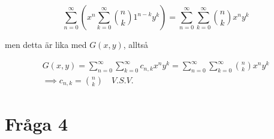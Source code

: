 \documentclass{article}
\begin{document}
\begin{enumerate}[label=(\roman*)]
		 \begin{equation*}
			 \sum\limits_{n=0}^{\infty} \left( x^{n} \sum\limits_{k=0}^{\infty} {n \choose k} 1^{n - k} y^{k} \right) = \sum\limits_{n=0}^{\infty} \sum\limits_{k=0}^{\infty} {n \choose k} x^{n} y^{k}
		 \end{equation*}

		 men detta är lika med $G(x,y)$, alltså

		 \begin{gather*}
			 G(x,y) = \sum\limits_{n = 0}^{\infty} \sum\limits_{k=0}^{\infty} c_{n,k} x^{n} y^{k} = \sum\limits_{n=0}^{\infty} \sum\limits_{k=0}^{\infty} {n \choose k} x^{n} y^{k}\\
			 \implies c_{n,k} = {n \choose k} \quad V.S.V.
		 \end{gather*}

\end{enumerate}

\section{Fråga 4}
\end{document}
